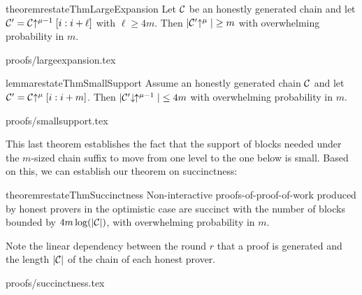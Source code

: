 \begin{restatable}{theorem}{restateThmLargeExpansion}
    \label{thm.large-expansion}
    Let $\mathcal{C}$ be an honestly generated chain and let
    $\mathcal{C}' = \mathcal{C}\negthickspace\uparrow^{\mu - 1}[i:i + \ell]$ with $\ell \geq 4m$.
    Then $|\mathcal{C}'\negthickspace\uparrow^\mu| \geq m$
    with overwhelming probability in $m$.
\end{restatable}

\ifonecolumn
{proofs/largeexpansion.tex}
\fi

\begin{restatable}{lemma}{restateThmSmallSupport}
    \label{lem.small-support}
    Assume an honestly generated chain $\mathcal{C}$ and let $\mathcal{C}' = \mathcal{C}\negthickspace\uparrow^\mu[i:i + m]$. Then
    $|\mathcal{C}'\negthickspace\downarrow\,\negthickspace\uparrow^{\mu - 1}| \leq 4m$
    with overwhelming probability in $m$.
\end{restatable}

\ifonecolumn
{proofs/smallsupport.tex}
\fi

This last theorem establishes the fact that the support of blocks needed under
the $m$-sized chain suffix to move from one level to the one below is small.
Based on this, we can establish our theorem on succinctness:

\begin{restatable}{theorem}{restateThmSuccinctness}
    \label{thm.succinctness}
    Non-interactive proofs-of-proof-of-work produced by honest provers in the
    optimistic case are succinct with the number of blocks bounded by $4m
    \log(|\mathcal{C}|)$, with overwhelming probability in $m$.
\end{restatable}

Note the linear dependency between the round $r$ that a proof is generated
and the length $|\mathcal{C}|$ of the chain of each honest prover.

\ifonecolumn
{proofs/succinctness.tex}
\else
\fi

